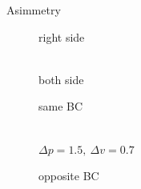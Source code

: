 \documentclass[aspectratio=169,xcolor=dvipsnames]{beamer}
\begin{document}
\begin{frame}{Asimmetry}
\begin{figure}
	\centering
	\scriptsize{right side}
		\begin{minipage}{\linewidth}
			\begin{minipage}{0.7\linewidth}\centering
	 \fontsize{3pt}{4pt}	
			\end{minipage}\hfill
			\begin{minipage}{0.3\linewidth}\centering
 \fontsize{3pt}{4pt}\selectfont{\def\svgwidth{\linewidth}
	}\vspace{0.03\linewidth}
 \fontsize{3pt}{4pt}\selectfont{\def\svgwidth{\linewidth}
	}	
			\end{minipage}\hfill
		\end{minipage}
	\centering
	\\\vspace{0.02\linewidth}
	\scriptsize{both side}
				\vspace{0.01\linewidth}\\
	\begin{minipage}{\linewidth}
		\begin{minipage}{0.5\linewidth}\centering
				\tiny{same BC}\\\vspace{0.03\linewidth}
				\begin{minipage}{0.45\linewidth}
					 \fontsize{3pt}{4pt}\selectfont{\def\svgwidth{\linewidth}
					}
				\end{minipage}	\hspace{0.02\linewidth}
				\begin{minipage}{0.45\linewidth}
					 \fontsize{3pt}{4pt}\selectfont{\def\svgwidth{\linewidth}
					}	
				\end{minipage}
			\vspace{0.03\linewidth}
			\\ \tiny{$\Delta p =1.5 ,\:\Delta v = 0.7$}
		\end{minipage}\hfill
		\begin{minipage}{0.5\linewidth}\centering
				\tiny{opposite BC}\\\vspace{0.03\linewidth}
				\begin{minipage}{0.45\linewidth}
				\fontsize{3pt}{4pt}\selectfont{\def\svgwidth{\linewidth}
					}
			\end{minipage}	\hspace{0.02\linewidth}

\end{minipage}
\end{minipage}
\end{figure}
\end{frame}
\end{document}
